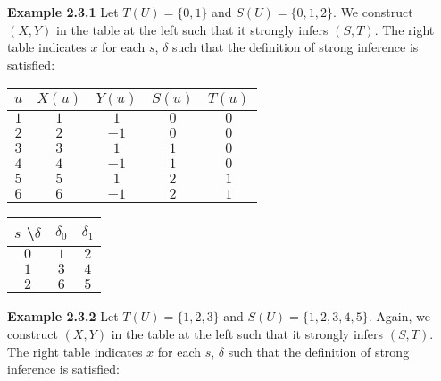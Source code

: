 \documentclass[11pt]{article}
\begin{document}
 
 \textbf{Example 2.3.1} \quad Let $ T(U) = \{0 , 1\} $ and $ S(U) = \{0, 1, 2\} $. We construct $ (X, Y) $ in the table at the left such that it strongly infers $ (S, T) $. The right table indicates $ x $ for each $ s $, $ \delta $ such that the definition of strong inference is satisfied: \\ 
 \begin {center}
 \begin{tabular}{ |c||c|c|c|c| } 

 \hline
 $ u $ & $ X(u) $ & $ Y(u) $ & $ S(u) $ & $ T(u) $ \\ 
 \hline
 \hline
 $ 1 $ & $ 1 $ & $ 1 $ & $ 0 $ & $ 0 $ \\
 \hline
 $ 2 $ & $ 2 $ & $ -1 $ & $ 0 $ & $ 0 $ \\
 \hline
 $ 3 $ & $ 3 $ & $ 1 $ & $ 1 $ & $ 0 $ \\
 \hline
 $ 4 $ & $ 4 $ & $ -1 $ & $ 1 $ & $ 0 $ \\
 \hline 
 $ 5 $ & $ 5 $ & $ 1 $ & $ 2 $ & $ 1 $ \\
 \hline 
 $ 6 $ & $ 6 $ & $ -1 $ & $ 2 $ & $ 1 $ \\
 \hline
 \end{tabular} 
 \quad 
 \begin{tabular}{ |c||c|c| } 

 \hline
 $ s $ \textbackslash $ \delta $ & $ \delta_0 $ & $ \delta_1 $ \\ 
 \hline
 \hline
 $ 0 $ & $ 1 $ & $ 2 $  \\
 \hline
 $ 1 $ & $ 3 $ & $ 4 $ \\
 \hline
 $ 2 $ & $ 6 $ & $ 5 $ \\
 \hline
 
 \end{tabular}
 \end{center}
 
  
 \bigskip
 \bigskip 
 \textbf{Example 2.3.2} \quad Let $ T(U) = \{1, 2, 3\} $ and $ S(U) = \{1, 2, 3, 4, 5\} $. Again, we construct $ (X, Y) $ in the table at the left such that it strongly infers $ (S, T) $. The right table indicates $ x $ for each $ s $, $ \delta $ such that the definition of strong inference is satisfied: \\ 
\end{document}
